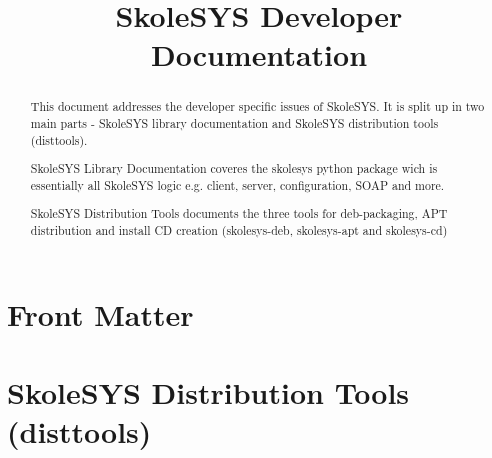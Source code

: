 \documentclass{manual}
\title{SkoleSYS Developer Documentation}
\begin{document}
\maketitle

\ifhtml
\chapter*{Front Matter\label{front}}
\fi

\begin{abstract}

\noindent
This document addresses the developer specific issues of SkoleSYS. It is
split up in two main parts - SkoleSYS library documentation and SkoleSYS
distribution tools (disttools).

SkoleSYS Library Documentation coveres the skolesys python package wich
is essentially all SkoleSYS logic e.g. client, server, configuration, SOAP
and more.

SkoleSYS Distribution Tools documents the three tools for deb-packaging,
APT distribution and install CD creation (skolesys-deb, skolesys-apt and 
skolesys-cd)

\end{abstract}

\tableofcontents

\chapter{SkoleSYS Distribution Tools (disttools)\label{disttools}} 


%



\end{document}
